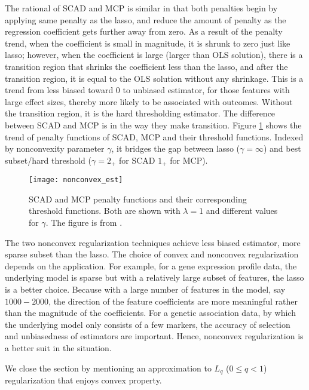 The rational of SCAD and MCP is similar in that both penalties begin by applying same penalty as the lasso, and reduce the amount of penalty as the regression coefficient gets further away from zero. As a result of the penalty trend, when the coefficient is small in magnitude, it is shrunk to zero just like lasso; however, when the coefficient is large (larger than OLS solution), there is a transition region that shrinks the coefficient less than the lasso, and after the transition region, it is equal to the OLS solution without any shrinkage. This is a trend from less biased toward 0 to unbiased estimator, for those features with large effect sizes, thereby more likely to be associated with outcomes. Without the transition region, it is the hard thresholding estimator. The difference between SCAD and MCP is in the way they make transition. Figure \ref{fig:nonconvex_est} shows the trend of penalty functions of SCAD, MCP and their threshold functions. Indexed by nonconvexity parameter $\gamma$, it bridges the gap between lasso ($\gamma=\infty$) and best subset/hard threshold ($\gamma=2_+$ for SCAD $1_+$ for MCP).   
\begin{figure}[tbh]
  \centering
  \texttt{[image: nonconvex\_est]}
  \caption[SCAD and MCP penalty functions and their corresponding threshold functions] {
    SCAD and MCP penalty functions and their corresponding threshold functions. Both are shown with $\lambda=1$ and different values for $\gamma$. The figure is from \cite{mazumder2011sparsenet}. 
  }
  \label{fig:nonconvex_est}
\end{figure}

The two nonconvex regularization techniques achieve less biased estimator, more sparse subset than the lasso. The choice of convex and nonconvex regularization depends on the application. For example, for a gene expression profile data, the underlying model is sparse but with a relatively large subset of features, the lasso is a better choice. Because with a large number of features in the model, say $1000-2000$, the direction of the feature coefficients are more meaningful rather than the magnitude of the coefficients. For a genetic association data, by which the underlying model only consists of a few markers, the accuracy of selection and unbiasedness of estimators are important. Hence, nonconvex regularization is a better suit in the situation.

We close the section by mentioning an approximation to $L_q$ ($0\leq q <1$) regularization that enjoys convex property.

